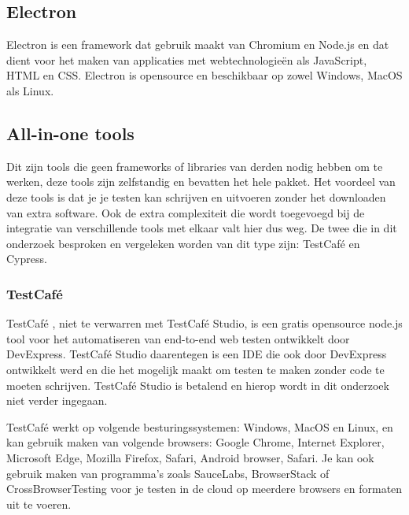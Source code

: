 \subsection{Electron}

Electron is een framework dat gebruik maakt van Chromium en Node.js en dat dient voor het maken van applicaties met webtechnologieën als JavaScript, HTML en CSS. Electron is opensource en beschikbaar op zowel Windows, MacOS als Linux.

\subsection{All-in-one tools}

Dit zijn tools die geen frameworks of libraries van derden nodig hebben om te werken, deze tools zijn zelfstandig en bevatten het hele pakket. Het voordeel van deze tools is dat je je testen kan schrijven en uitvoeren zonder het downloaden van extra software. Ook de extra complexiteit die wordt toegevoegd bij de integratie van verschillende tools met elkaar valt hier dus weg. De twee die in dit onderzoek besproken en vergeleken worden van dit type zijn: TestCafé en Cypress.

\subsubsection{TestCafé}
TestCafé \autocite{Testcafe}, niet te verwarren met TestCafé Studio, is een  gratis opensource node.js tool voor het automatiseren van end-to-end web testen ontwikkelt door DevExpress. TestCafé Studio daarentegen is een IDE die ook door DevExpress ontwikkelt werd en die het mogelijk maakt om testen te maken zonder code te moeten schrijven. TestCafé Studio is betalend en hierop wordt in dit onderzoek niet verder ingegaan. 

TestCafé werkt op volgende besturingssystemen: Windows, MacOS en Linux, en kan gebruik maken van volgende browsers: Google Chrome, Internet Explorer, Microsoft Edge, Mozilla Firefox, Safari, Android browser, Safari. Je kan ook gebruik maken van programma's zoals SauceLabs, BrowserStack of CrossBrowserTesting voor je testen in de cloud op meerdere browsers en formaten uit te voeren.

